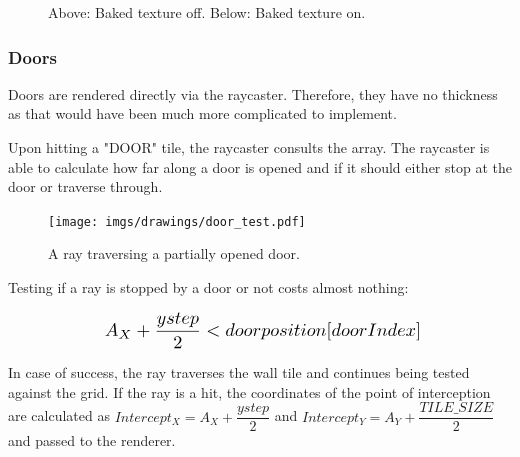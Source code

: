 \begin{minipage}{\textwidth}
\begin{figure}[H]
\centering
 \caption{Above: Baked texture off. Below: Baked texture on.}
 \end{figure}

\begin{figure}[H]
\centering
 
 \end{figure}
 \end{minipage}

 





\subsubsection{Doors}
Doors are rendered directly via the raycaster. Therefore, they have no thickness as that would have been much more complicated to implement.\\
\par
\begin{figure}[H]
 \centering
\end{figure}

\par
Upon hitting a "DOOR" tile, the raycaster consults the  array. The raycaster is able to calculate how far along a door is opened and if it should either stop at the door or traverse through.\\

\begin{minipage}{\textwidth}

\end{minipage}

\par 
 \par
\begin{figure}[H]
  \centering
 \texttt{[image: imgs/drawings/door\_test.pdf]}
 \caption{A ray traversing a partially opened door.}
\end{figure}
\par
Testing if a ray is stopped by a door or not costs almost nothing:\\
\par

\begin{equation*}
    \scalebox{1.3}{
$A_{X} + \dfrac{ystep}{2} < doorposition[doorIndex]$\\
}
\end{equation*}
\par
 In case of success, the ray traverses the wall tile and continues being tested against the grid. If the ray is a hit, the coordinates of the point of interception are calculated as $Intercept_{X} = A_{X} + \dfrac{ystep}{2}$ and $Intercept_{Y} = A_{Y} + \dfrac{TILE\_SIZE}{2}$ and passed to the renderer.













